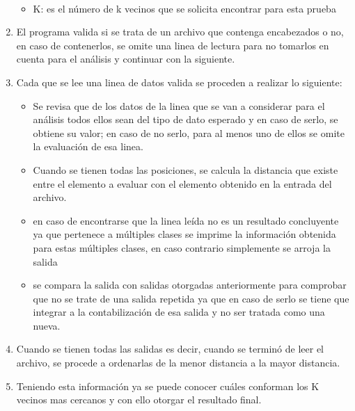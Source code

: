 \begin{enumerate}
\begin{itemize}
		\\
		\item K: es el número de k vecinos que se solicita encontrar para esta prueba   
	\end{itemize}
	\item El programa valida si se trata de un archivo que contenga encabezados o no, en caso de contenerlos, se omite una linea de lectura para no tomarlos en cuenta para el análisis y continuar con la siguiente.
	\item Cada que se lee una linea de datos valida se proceden a realizar lo siguiente:
	\begin{itemize}
		\item Se revisa que de los datos de la linea que se van a considerar para el análisis todos ellos sean del tipo de dato esperado y en caso de serlo, se obtiene su valor; en caso de no serlo, para al menos uno de ellos se omite la evaluación de esa linea.
		\item Cuando se tienen todas las posiciones, se calcula la distancia que existe entre el elemento a evaluar con el elemento obtenido en la entrada del archivo. 
		\item en caso de encontrarse que la linea leída no es un resultado concluyente ya que pertenece a múltiples clases se imprime la información obtenida para estas múltiples clases, en caso contrario simplemente se arroja la salida
		\item se compara la salida con salidas otorgadas anteriormente para comprobar que no se trate de una salida repetida ya que en caso de serlo se tiene que integrar a la contabilización de esa salida y no ser tratada como una nueva.
	\end{itemize} 
	\item Cuando se tienen todas las salidas es decir, cuando se terminó de leer el archivo, se procede a ordenarlas de la menor distancia a la mayor distancia.
	\item Teniendo esta información ya se puede conocer cuáles conforman los K vecinos mas cercanos y con ello otorgar el resultado final.
\end{enumerate}
